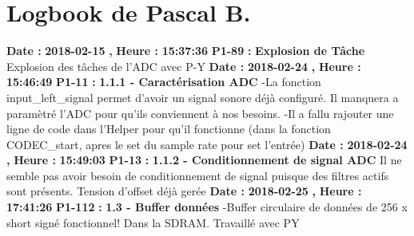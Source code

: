 \documentclass{article}%
\begin{document}
\section{Logbook de Pascal B.}%
\textbf{Date : }%
\textbf{2018{-}02{-}15}%
\textbf{,}%
\textbf{ Heure : }%
\textbf{15:37:36}%
\newline%
%
\textbf{P1{-}89 }%
\textbf{ : }%
\textbf{ Explosion de Tâche}%
\newline%
\newline%
%
Explosion des tâches de l'ADC avec P{-}Y\newline%
\newline%
%
\textbf{Date : }%
\textbf{2018{-}02{-}24}%
\textbf{,}%
\textbf{ Heure : }%
\textbf{15:46:49}%
\newline%
%
\textbf{P1{-}11 }%
\textbf{ : }%
\textbf{ 1.1.1 {-} Caractérisation ADC}%
\newline%
\newline%
%
{-}La fonction input\_left\_signal permet d'avoir un signal sonore déjà configuré. Il manquera a paramètré l'ADC pour qu'ils conviennent à nos besoins.\newline%
{-}Il a fallu rajouter une ligne de code dans l'Helper pour qu'il fonctionne (dans la fonction CODEC\_start, apres le set du sample rate pour set l'entrée)\newline%
\newline%
%
\textbf{Date : }%
\textbf{2018{-}02{-}24}%
\textbf{,}%
\textbf{ Heure : }%
\textbf{15:49:03}%
\newline%
%
\textbf{P1{-}13 }%
\textbf{ : }%
\textbf{ 1.1.2 {-} Conditionnement de signal ADC}%
\newline%
\newline%
%
Il ne semble pas avoir besoin de conditionnement de signal puisque des filtres actifs sont présents.\newline%
Tension d'offset déjà gerée\newline%
\newline%
%
\textbf{Date : }%
\textbf{2018{-}02{-}25}%
\textbf{,}%
\textbf{ Heure : }%
\textbf{17:41:26}%
\newline%
%
\textbf{P1{-}112 }%
\textbf{ : }%
\textbf{ 1.3 {-} Buffer données}%
\newline%
\newline%
%
{-}Buffer circulaire de données de 256 x short signé fonctionnel! Dans la SDRAM. Travaillé avec PY\newline%
\newline%
%
\newpage
\end{document}
